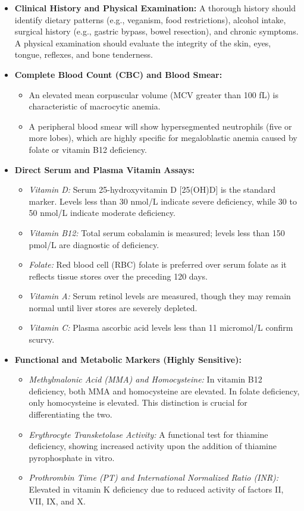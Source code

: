 \begin{itemize}
    \item \textbf{Clinical History and Physical Examination:} A thorough history should identify dietary patterns (e.g., veganism, food restrictions), alcohol intake, surgical history (e.g., gastric bypass, bowel resection), and chronic symptoms. A physical examination should evaluate the integrity of the skin, eyes, tongue, reflexes, and bone tenderness.

    \item \textbf{Complete Blood Count (CBC) and Blood Smear:}
    \begin{itemize}
        \item An elevated mean corpuscular volume (MCV greater than 100 fL) is characteristic of macrocytic anemia.
        \item A peripheral blood smear will show hypersegmented neutrophils (five or more lobes), which are highly specific for megaloblastic anemia caused by folate or vitamin B12 deficiency.
    \end{itemize}

    \item \textbf{Direct Serum and Plasma Vitamin Assays:}
    \begin{itemize}
        \item \textit{Vitamin D:} Serum 25-hydroxyvitamin D [25(OH)D] is the standard marker. Levels less than 30 nmol/L indicate severe deficiency, while 30 to 50 nmol/L indicate moderate deficiency.
        \item \textit{Vitamin B12:} Total serum cobalamin is measured; levels less than 150 pmol/L are diagnostic of deficiency.
        \item \textit{Folate:} Red blood cell (RBC) folate is preferred over serum folate as it reflects tissue stores over the preceding 120 days.
        \item \textit{Vitamin A:} Serum retinol levels are measured, though they may remain normal until liver stores are severely depleted.
        \item \textit{Vitamin C:} Plasma ascorbic acid levels less than 11 micromol/L confirm scurvy.
    \end{itemize}

    \item \textbf{Functional and Metabolic Markers (Highly Sensitive):}
    \begin{itemize}
        \item \textit{Methylmalonic Acid (MMA) and Homocysteine:} In vitamin B12 deficiency, both MMA and homocysteine are elevated. In folate deficiency, only homocysteine is elevated. This distinction is crucial for differentiating the two.
        \item \textit{Erythrocyte Transketolase Activity:} A functional test for thiamine deficiency, showing increased activity upon the addition of thiamine pyrophosphate in vitro.
        \item \textit{Prothrombin Time (PT) and International Normalized Ratio (INR):} Elevated in vitamin K deficiency due to reduced activity of factors II, VII, IX, and X.
    \end{itemize}


\end{itemize}
